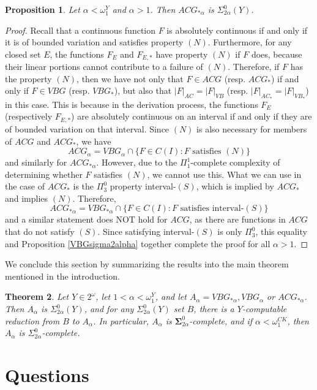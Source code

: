 \documentclass[12pt]{amsart}
\newtheorem{theorem}{Theorem}
\newtheorem{prop}[theorem]{Proposition}
\begin{document}
\begin{prop}
Let $\alpha < \omega_1^Y$ and $\alpha >1$.  Then $ACG_{\ast\alpha}$
is $\Sigma^0_{2\alpha}(Y)$.
\end{prop}
\begin{proof}
Recall that a continuous function $F$ is absolutely continuous if and only if 
it is of bounded variation and satisfies property $(N)$.  Furthermore, 
for any closed set $E$, the functions $F_E$ and $F_{E,\ast}$ have 
property $(N)$ if $F$ does, because their linear portions cannot contribute 
to a failure of $(N)$.  Therefore, if $F$ has the property $(N)$, 
then we have not only that $F \in ACG$ (resp. $ACG_\ast$) if and only 
if $F \in VBG$ (resp. $VBG_\ast$), but also that $|F|_{AC} = |F|_{VB}$ 
(resp. $|F|_{AC_\ast} = |F|_{VB_\ast}$) in this case.  This is because 
in the derivation process, the functions $F_E$ (respectively $F_{E,\ast}$) 
are absolutely continuous on an interval 
if and only if they are of bounded variation on that interval.  Since 
$(N)$ is also necessary for members of $ACG$ and $ACG_\ast$, we have
$$ACG_\alpha = VBG_\alpha \cap \{F \in C(I) : F \text{ satisfies } (N)\}$$
and similarly for $ACG_{\ast\alpha}$.  
However, {due to the $\Pi^1_1$-complete complexity \cite{HPZZ1998}
of determining whether $F$ satisfies $(N)$}, we cannot use this.  
What we can use in the case of $ACG_\ast$ 
is the $\Pi^0_3$ property interval-$(S)$, which is implied by $ACG_\ast$ 
and implies $(N)$.  Therefore,
$$ACG_{\ast\alpha} = VBG_{\ast\alpha} \cap \{F \in C(I) : F \text{ satisfies interval-}(S)\}$$
and a similar statement does NOT hold for $ACG$, as there are functions 
in $ACG$ that do not satisfy $(S)$.  Since satisfying interval-$(S)$ 
is only $\Pi^0_3$, this equality and Proposition \ref{VBGsigma2alpha} 
together complete the proof for all $\alpha>1$.
\end{proof}
We conclude this section by summarizing the results into the main theorem 
mentioned in the introduction.
\begin{theorem}
Let $Y \in 2^\omega$, 
let $1<\alpha < \omega_1^Y$, 
and let $A_\alpha = VBG_{\ast\alpha}, VBG_\alpha$ or $ACG_{\ast\alpha}.$  Then
$A_\alpha$ is $\Sigma^0_{2\alpha}(Y)$, and for any 
$\Sigma^0_{2\alpha}(Y)$ set $B$, there is a $Y$-computable reduction from 
$B$ to $A_\alpha$.
In particular, $A_\alpha$ is $\mathbf \Sigma^0_{2\alpha}$-complete,
and if $\alpha< \omega_1^{CK}$, then $A_\alpha$ is $\Sigma^0_{2\alpha}$-complete.
\end{theorem}


\section{Questions}\label{sec:questions}
\end{document}
